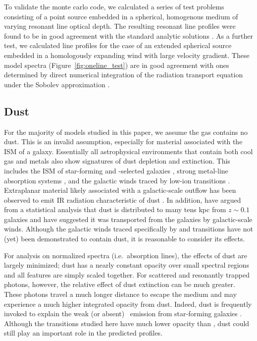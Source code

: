 \documentclass[12pt,preprint]{aastex}
\begin{document}
To validate the monte carlo code, we calculated a series of test problems consisting of a point source embedded in a spherical, homogenous medium of varying resonant line optical depth.  The resulting resonant line profiles  \citep[see][]{Kasen_lyman} were
found to be in good agreement with the standard analytic solutions
\citep{Harrington_1973,Neufeld_1990,Dijkstra_2006}.  As a further
test, we calculated line profiles for the case of an extended
spherical source embedded in a homologously expanding wind with large
velocity gradient.  These model spectra
(Figure~\ref{fig:oneline_test}) are in good agreement with ones
determined by direct numerical integration of the radiation transport
equation under the Sobolev approximation \citep[e.g.,][]{Jeffery_Branch}.


\subsection{Dust}
\label{sec:dust_method}

For the majority of models studied in this paper, we assume the gas
contains no dust.
This is an invalid assumption, especially for material associated with
the ISM of a galaxy.  
Essentially all astrophysical environments that contain both cool gas
and metals also show signatures of dust depletion and extinction.  This includes the
ISM of star-forming and -selected galaxies
\citep[e.g.][]{ss96,pw01,pcd+07}, strong  metal-line
absorption systems \citep{ykv+06,mnt+08}, and the galactic winds traced
by low-ion transitions \citep{prs+02,rvs05b}.  
Extraplanar material likely associated with a galactic-scale 
outflow has been observed to emit IR radiation characteristic of dust 
\citep[e.g.][]{hrg90,adb99,rkl01}.
In addition, \cite{msf+10} have argued from a statistical analysis
that dust is distributed to many tens kpc from $z \sim 0.1$ galaxies
and have suggested it was transported from the galaxies by
galactic-scale winds.  
Although the galactic winds
traced specifically by  and  transitions have not (yet) been
demonstrated to contain dust, it is reasonable to consider its effects.

For analysis on normalized spectra (i.e.\ absorption lines), the effects of dust are largely minimized; 
dust has a nearly constant opacity over small spectral regions and all
features are simply scaled together.
For scattered and resonantly trapped photons, however, the relative effect of dust
extinction can be much greater.  
These photons travel a much longer distance to escape the medium and
may experience a much higher integrated opacity from dust.
Indeed, dust is frequently invoked to
explain the weak (or absent) \lya\ emission from star-forming galaxies
\citep[e.g.][]{shapley03}.  Although the transitions studied here have
much lower opacity than \lya, dust could still play an important role
in the predicted profiles.
\end{document}
